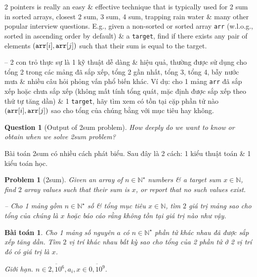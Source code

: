 \documentclass{article}
\newtheorem{baitoan}{Bài toán}
\newtheorem{problem}{Problem}
\newtheorem{question}{Question}
\begin{document}
2 pointers is really an easy \& effective technique that is typically used for 2 sum in sorted arrays, closest 2 sum, 3 sum, 4 sum, trapping rain water \& many other popular interview questions. E.g., given a non-sorted or sorted array {\tt arr} (w.l.o.g., sorted in ascending order by default) \& a {\tt target}, find if there exists any pair of elements $({\tt arr}[i],{\tt arr}[j])$ such that their sum is equal to the target.

-- 2 con trỏ thực sự là 1 kỹ thuật dễ dàng \& hiệu quả, thường được sử dụng cho tổng 2 trong các mảng đã sắp xếp, tổng 2 gần nhất, tổng 3, tổng 4, bẫy nước mưa \& nhiều câu hỏi phỏng vấn phổ biến khác. Ví dụ: cho 1 mảng {\tt arr} đã sắp xếp hoặc chưa sắp xếp (không mất tính tổng quát, mặc định được sắp xếp theo thứ tự tăng dần) \& 1 {\tt target}, hãy tìm xem có tồn tại cặp phần tử nào $({\tt arr}[i],{\tt arr}[j])$ sao cho tổng của chúng bằng với mục tiêu hay không.

\begin{question}[Output of {\sf2sum} problem]
    How deeply do we want to know or obtain when we solve {\sc2sum} problem?
\end{question}
Bài toán {\sc2sum} có nhiều cách phát biểu. Sau đây là 2 cách: 1 kiểu thuật toán \& 1 kiểu toán học.

\begin{problem}[{\sc2sum}]
    Given an array of $n\in\mathbb{N}^\star$ numbers \& a target sum $x\in\mathbb{N}$, find $2$ array values such that their sum is $x$, or report that no such values exist.

    -- Cho 1 mảng gồm $n\in\mathbb{N}^\star$ số \& tổng mục tiêu $x\in\mathbb{N}$, tìm $2$ giá trị mảng sao cho tổng của chúng là $x$ hoặc báo cáo rằng không tồn tại giá trị nào như vậy.
\end{problem}

\begin{center}
\end{center}

\begin{baitoan}
    Cho 1 mảng số nguyên $a$ có $n\in\mathbb{N}^\star$ phần tử khác nhau đã được sắp xếp tăng dần. Tìm $2$ vị trí khác nhau bất kỳ sao cho tổng của 2 phần tử ở 2 vị trí đó có giá trị là $x$.
    \item {\sf Giới hạn.} $n\in\overline{2,10^6},a_i,x\in\overline{0,10^9}$.
\end{baitoan}
\end{document}
